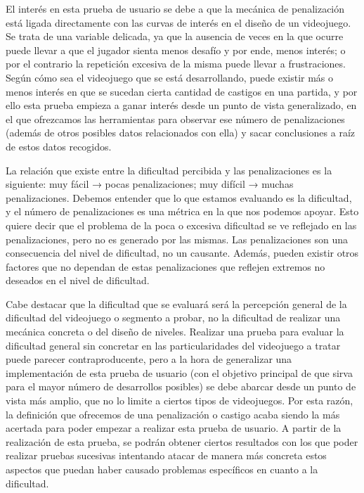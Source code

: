 El interés en esta prueba de usuario se debe a que la mecánica de penalización está ligada directamente con las curvas de interés en el diseño de un videojuego. Se trata de una variable delicada, ya que la ausencia de veces en la que ocurre puede llevar a que el jugador sienta menos desafío y por ende, menos interés; o por el contrario la repetición excesiva de la misma puede llevar a frustraciones. Según cómo sea el videojuego que se está desarrollando, puede existir más o menos interés en que se sucedan cierta cantidad de castigos en una partida, y por ello esta prueba empieza a ganar interés desde un punto de vista generalizado, en el que ofrezcamos las herramientas para observar ese número de penalizaciones (además de otros posibles datos relacionados con ella) y sacar conclusiones a raíz de estos datos recogidos. 

La relación que existe entre la dificultad percibida y las penalizaciones es la siguiente: muy fácil → pocas penalizaciones; muy difícil → muchas penalizaciones. Debemos entender que lo que estamos evaluando es la dificultad, y el número de penalizaciones es una métrica en la que nos podemos apoyar. Esto quiere decir que el problema de la poca o excesiva dificultad se ve reflejado en las penalizaciones, pero no es generado por las mismas. Las penalizaciones son una consecuencia del nivel de dificultad, no un causante. Además, pueden existir otros factores que no dependan de estas penalizaciones que reflejen extremos no deseados en el nivel de dificultad.

Cabe destacar que la dificultad que se evaluará será la percepción general de la dificultad del videojuego o segmento a probar, no la dificultad de realizar una mecánica concreta o del diseño de niveles. Realizar una prueba para evaluar la dificultad general sin concretar en las particularidades del videojuego a tratar puede parecer contraproducente, pero a la hora de generalizar una implementación de esta prueba de usuario (con el objetivo principal de que sirva para el mayor número de desarrollos posibles) se debe abarcar desde un punto de vista más amplio, que no lo limite a ciertos tipos de videojuegos. Por esta razón, la definición que ofrecemos de una penalización o castigo acaba siendo la más acertada para poder empezar a realizar esta prueba de usuario. A partir de la realización de esta prueba, se podrán obtener ciertos resultados con los que poder realizar pruebas sucesivas intentando atacar de manera más concreta estos aspectos que puedan haber causado problemas específicos en cuanto a la dificultad.

